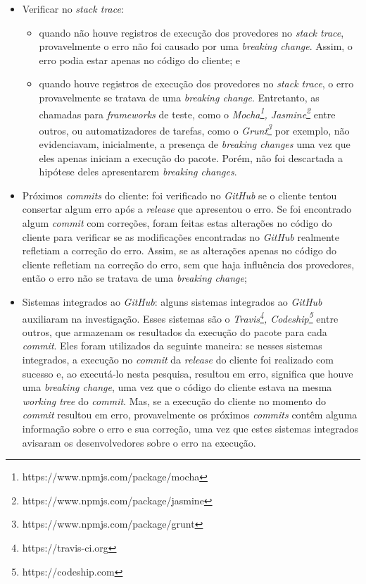 \begin{itemize}
    \item Verificar no \textit{stack trace}:
    \begin{itemize}
        \item quando não houve registros de execução dos provedores no \textit{stack trace}, provavelmente o erro não foi causado por uma \textit{breaking change}. Assim, o erro podia estar apenas no código do cliente; e

        \item quando houve registros de execução dos provedores no \textit{stack trace}, o erro provavelmente se tratava de uma \textit{breaking change}. Entretanto, as chamadas para \textit{frameworks} de teste, como o \textit{Mocha\footnote{https://www.npmjs.com/package/mocha}, Jasmine\footnote{https://www.npmjs.com/package/jasmine}} entre outros, ou automatizadores de tarefas, como o \textit{Grunt\footnote{https://www.npmjs.com/package/grunt}} por exemplo, não evidenciavam, inicialmente, a presença de \textit{breaking changes} uma vez que eles apenas iniciam a execução do pacote. Porém, não foi descartada a hipótese deles apresentarem \textit{breaking changes}.
    \end{itemize}{}

    \item  Próximos \textit{commits} do cliente: foi verificado no \textit{GitHub} se o cliente tentou consertar algum erro após a \textit{release} que apresentou o erro. Se foi encontrado algum \textit{commit} com correções, foram feitas estas alterações no código do cliente para verificar se as modificações encontradas no \textit{GitHub} realmente refletiam a correção do erro. Assim, se as alterações apenas no código do cliente refletiam na correção do erro, sem que haja influência dos provedores, então o erro não se tratava de uma \textit{breaking change};

    \item Sistemas integrados ao \textit{GitHub}: alguns sistemas integrados ao \textit{GitHub} auxiliaram na investigação. Esses sistemas são o \textit{Travis\footnote{https://travis-ci.org}, Codeship\footnote{https://codeship.com}} entre outros, que armazenam os resultados da execução do pacote para cada \textit{commit}. Eles foram utilizados da seguinte maneira: se nesses sistemas integrados, a execução no \textit{commit} da \textit{release} do cliente foi realizado com sucesso e, ao executá-lo nesta pesquisa, resultou em erro, significa que houve uma \textit{breaking change}, uma vez que o código do cliente estava na mesma \textit{working tree} do \textit{commit}. Mas, se a execução do cliente no momento do \textit{commit} resultou em erro, provavelmente os próximos \textit{commits} contêm alguma informação sobre o erro e sua correção, uma vez que estes sistemas integrados avisaram os desenvolvedores sobre o erro na execução.
    

\end{itemize}
